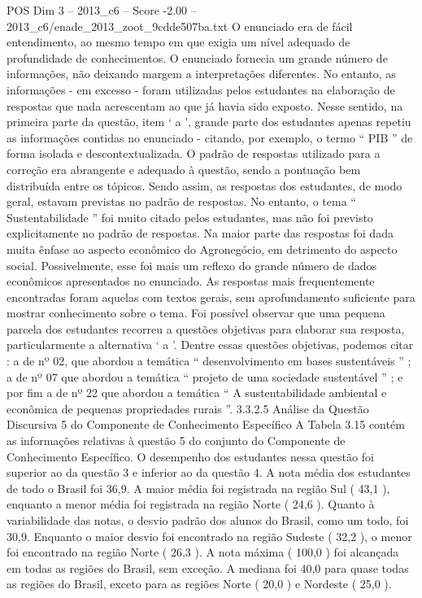 \begin{textsample}{POS Dim 3 – 2013\_c6 – Score -2.00 – 2013\_c6/enade\_2013\_zoot\_9cdde507ba.txt}
O enunciado era de fácil entendimento, ao mesmo tempo em que exigia um nível adequado de profundidade de conhecimentos.
O enunciado fornecia um grande número de informações, não deixando margem a interpretações diferentes.
No entanto, as informações - em excesso - foram utilizadas pelos estudantes na elaboração de respostas que nada acrescentam ao que já havia sido exposto.
Nesse sentido, na primeira parte da questão, item ‘ a ’, grande parte dos estudantes apenas repetiu as informações contidas no enunciado - citando, por exemplo, o termo “ PIB ” de forma isolada e descontextualizada.
O padrão de respostas utilizado para a correção era abrangente e adequado à questão, sendo a pontuação bem distribuída entre os tópicos.
Sendo assim, as respostas dos estudantes, de modo geral, estavam previstas no padrão de respostas.
No entanto, o tema “ Sustentabilidade ” foi muito citado pelos estudantes, mas não foi previsto explicitamente no padrão de respostas.
Na maior parte das respostas foi dada muita ênfase ao aspecto econômico do Agronegócio, em detrimento do aspecto social.
Possivelmente, esse foi mais um reflexo do grande número de dados econômicos apresentados no enunciado.
As respostas mais frequentemente encontradas foram aquelas com textos gerais, sem aprofundamento suficiente para mostrar conhecimento sobre o tema.
Foi possível observar que uma pequena parcela dos estudantes recorreu a questões objetivas para elaborar sua resposta, particularmente a alternativa ‘ a ’.
Dentre essas questões objetivas, podemos citar : a de nº 02, que abordou a temática “ desenvolvimento em bases sustentáveis ” ; a de nº 07 que abordou a temática “ projeto de uma sociedade sustentável ” ; e por fim a de nº 22 que abordou a temática “ A sustentabilidade ambiental e econômica de pequenas propriedades rurais ”. 3.3.2.5 Análise da Questão Discursiva 5 do Componente de Conhecimento Específico A Tabela 3.15 contém as informações relativas à questão 5 do conjunto do Componente de Conhecimento Específico.
O desempenho dos estudantes nessa questão foi superior ao da questão 3 e inferior ao da questão 4.
A nota média dos estudantes de todo o Brasil foi 36,9.
A maior média foi registrada na região Sul ( 43,1 ), enquanto a menor média foi registrada na região Norte ( 24,6 ).
Quanto à variabilidade das notas, o desvio padrão dos alunos do Brasil, como um todo, foi 30,9.
Enquanto o maior desvio foi encontrado na região Sudeste ( 32,2 ), o menor foi encontrado na região Norte ( 26,3 ).
A nota máxima ( 100,0 ) foi alcançada em todas as regiões do Brasil, sem exceção.
A mediana foi 40,0 para quase todas as regiões do Brasil, exceto para as regiões Norte ( 20,0 ) e Nordeste ( 25,0 ).

\end{textsample}
